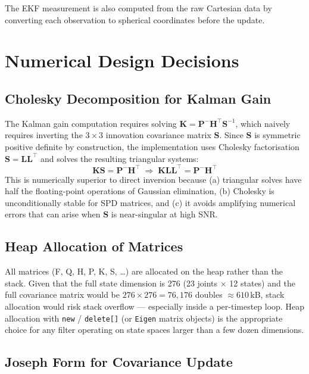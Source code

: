 \documentclass[12pt, a4paper]{article}
\begin{document}
The EKF measurement is also computed from the raw Cartesian data by converting each observation to spherical coordinates before the update.

\section{Numerical Design Decisions}

\subsection{Cholesky Decomposition for Kalman Gain}

The Kalman gain computation requires solving $\mathbf{K} = \mathbf{P}^-\mathbf{H}^\top \mathbf{S}^{-1}$, which naively requires inverting the $3\times3$ innovation covariance matrix $\mathbf{S}$. Since $\mathbf{S}$ is symmetric positive definite by construction, the implementation uses Cholesky factorisation $\mathbf{S} = \mathbf{L}\mathbf{L}^\top$ and solves the resulting triangular systems:
\[
\mathbf{K}\mathbf{S} = \mathbf{P}^-\mathbf{H}^\top \;\Longrightarrow\; \mathbf{K}\mathbf{L}\mathbf{L}^\top = \mathbf{P}^-\mathbf{H}^\top
\]
This is numerically superior to direct inversion because (a) triangular solves have half the floating-point operations of Gaussian elimination, (b) Cholesky is unconditionally stable for SPD matrices, and (c) it avoids amplifying numerical errors that can arise when $\mathbf{S}$ is near-singular at high SNR.

\subsection{Heap Allocation of Matrices}

All matrices (F, Q, H, P, K, S, \ldots) are allocated on the heap rather than the stack. Given that the full state dimension is 276 (23 joints $\times$ 12 states) and the full covariance matrix would be $276\times276 = 76{,}176$ doubles $\approx 610\,$kB, stack allocation would risk stack overflow — especially inside a per-timestep loop. Heap allocation with \texttt{new} / \texttt{delete[]} (or \texttt{Eigen} matrix objects) is the appropriate choice for any filter operating on state spaces larger than a few dozen dimensions.

\subsection{Joseph Form for Covariance Update}
\end{document}
